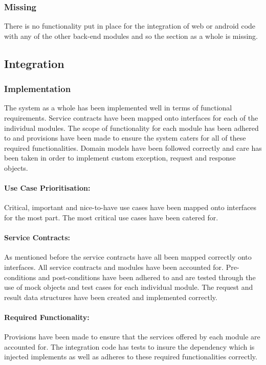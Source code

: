 \documentclass{article}
\begin{document}
        \subsubsection{Missing}
        There is no functionality put in place for the integration of web or android code with any of the other back-end modules and so the section as a whole is missing.
        
\cleardoublepage

    \subsection{Integration}
		\subsubsection{Implementation}
			The system as a whole has been implemented well in terms of functional requirements.
			Service contracts have been mapped onto interfaces for each of the individual modules.
			The scope of functionality for each module has been adhered to and provisions have been made to ensure the system caters for all of these required functionalities.
			Domain models have been followed correctly and care has been taken in order to implement custom exception, request and response objects.
			\paragraph{Use Case Prioritisation:}
			Critical, important and nice-to-have use cases have been mapped onto interfaces for the most part.
			The most critical use cases have been catered for.
			\paragraph{Service Contracts:}
			As mentioned before the service contracts have all been mapped correctly onto interfaces.
			All service contracts and modules have been accounted for.
			Pre-conditions and post-conditions have been adhered to and are tested through the use of mock objects and test cases for each individual module.
			The request and result data structures have been created and implemented correctly.
			\paragraph{Required Functionality:}
			Provisions have been made to ensure that the services offered by each module are accounted for.
			The integration code has tests to insure the dependency which is injected implements as well as adheres to these required functionalities correctly.
\end{document}
